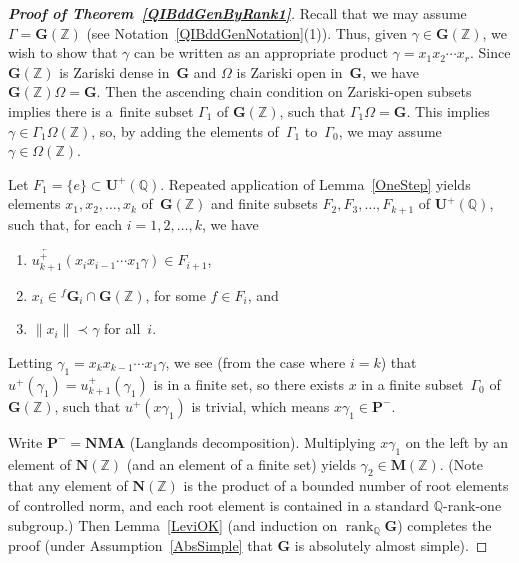 \documentclass[pdftex]{sigma}
\newcommand{\QQ}{\mathbb{Q}}
\newcommand{\ZZ}{\mathbb{Z}}
\newcommand{\Aa}{\mathbf{A}}
\newcommand{\Ga}{\mathbf{G}}
\newcommand{\Ma}{\mathbf{M}}
\newcommand{\Na}{\mathbf{N}}
\newcommand{\Pa}{\mathbf{P}}
\newcommand{\Ua}{\mathbf{U}}
\DeclareMathOperator{\rank}{rank}
\newcommand{\la}{\overleftarrow}
\numberwithin{equation}{section}
\theoremstyle{definition}
\begin{document}
\begin{proof}[\bf Proof of Theorem~\ref{QIBddGenByRank1}]
Recall that we may assume $\Gamma = \Ga(\ZZ)$ (see Notation~\ref{QIBddGenNotation}(1)).
Thus, given $\gamma \in \Ga(\ZZ)$, we wish to show that $\gamma$ can be written as an appropriate product $\gamma = x_1 x_2 \cdots x_r$. Since $\Ga(\ZZ)$ is Zariski dense in~$\Ga$ \cite[Theorem~4.10, p.~205]{MR1278263} and $\Omega$ is Zariski open in~$\Ga$, we have $\Ga(\ZZ) \Omega = \Ga$. Then the ascending chain condition on Zariski-open subsets implies there is a~finite subset $\Gamma_1$ of $\Ga(\ZZ)$, such that $\Gamma_1 \Omega = \Ga$. This implies $\gamma \in \Gamma_1 \Omega(\ZZ)$, so, by adding the elements of~$\Gamma_1$ to~$\Gamma_0$, we may assume $\gamma \in \Omega(\ZZ)$.

Let $F_1 = \{e\} \subset \Ua^+(\QQ)$. Repeated application of Lemma~\ref{OneStep} yields elements $x_1,x_2,\ldots,x_k$ of~$\Ga(\ZZ)$ and finite subsets $F_2, F_3,\ldots, F_{k+1}$ of $\Ua^+(\QQ)$, such that, for each $i = 1,2,\ldots,k$, we have
\begin{enumerate}\itemsep=0pt
\item[1)] $\la{u^+_{k+1}}(x_i x_{i-1} \cdots x_1 \gamma) \in F_{i+1}$,
\item[2)] $x_i \in {}^f \Ga_i \cap \Ga(\ZZ)$, for some $f \in F_{i}$, and
\item[3)] $\| x_i \| \prec \gamma$ for all~$i$.
	\end{enumerate}
Letting $\gamma_1 = x_k x_{k-1} \cdots x_1 \gamma$, we see (from the case where $i = k$) that $u^+(\gamma_1) = u^+_{k+1}(\gamma_1)$ is in a finite set, so there exists $x$ in a finite subset~$\Gamma_0$ of $\Ga(\ZZ)$, such that $u^+(x\gamma_1)$ is trivial, which means $x \gamma_1 \in \Pa^-$.

Write $\Pa^- = \Na \Ma \Aa$ (Langlands decomposition). Multiplying $x \gamma_1$ on the left by an element of $\Na(\ZZ)$ (and an element of a finite set) yields $\gamma_2 \in \Ma(\ZZ)$. (Note that any element of $\Na(\ZZ)$ is the product of a bounded number of root elements of controlled norm, and each root element is contained in a standard $\QQ$-rank-one subgroup.) Then Lemma~\ref{LeviOK} (and induction on $\rank_\QQ \Ga$) completes the proof (under Assumption~\ref{AbsSimple} that $\Ga$ is absolutely almost simple).
\end{proof}
\end{document}
